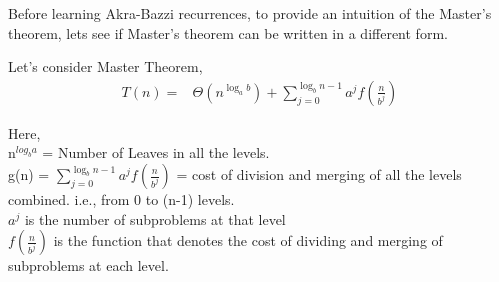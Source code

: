 \documentclass[11pt]{article}
\begin{document}
Before learning Akra-Bazzi recurrences, to provide an intuition of the Master's theorem, lets see if Master's theorem can be written in a different form.

Let's consider Master Theorem,\\
\begin{align*}
T(n) =& \Theta(n^{\log_a b}) + \sum_{j=0}^{\log_b n - 1} {a^{j}}f\left(\frac{n}{b^{j}}\right) 
\end{align*}

Here,\\ 

n$^{log_{b}a}$ = Number of Leaves in all the levels.\\
g(n) = $\sum_{j=0}^{\log_b n - 1} {a^{j}}f\left(\frac{n}{b^{j}}\right)$ = cost of division and merging of all the levels combined. i.e., from 0 to (n-1) levels.\\
$a^{j}$ is the number of subproblems at that level\\
$f\left(\frac{n}{b^{j}}\right)$ is the function that denotes the cost of dividing and merging of subproblems at each level.
\end{document}
